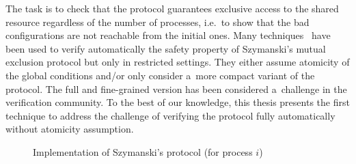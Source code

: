 \bigskip%
%
The task is to check that the protocol guarantees exclusive access to
the shared resource regardless of the number of processes, i.e.\ to
show that the bad configurations are not reachable from the initial
ones.
%
Many techniques~%
\cite{AbHaHo:view:abstraction,AbDeRe:context:sensitive,Parosh:non-atomic,CTV06,Namjoshi:VMCAI07,AJNO:simple,BHV04}
have been used to verify automatically the safety property of
Szymanski’s mutual exclusion protocol but only in restricted
settings. They either assume atomicity of the global conditions and/or
only consider a~more compact variant of the protocol.
%
%
The full and fine-grained version has been considered
a~challenge in the verification community.
%
%
To the best of our knowledge, this thesis presents the first technique
to address the challenge of verifying the protocol fully automatically
without atomicity assumption.


\begingroup%
\setlength\intextsep{\dazintextsep}
\begin{figure}[!b]%
  \centering
  \caption{Implementation of Szymanski's protocol (for process $i$)}
  \label{figure:szymanski:implementation}
\end{figure}
\endgroup

